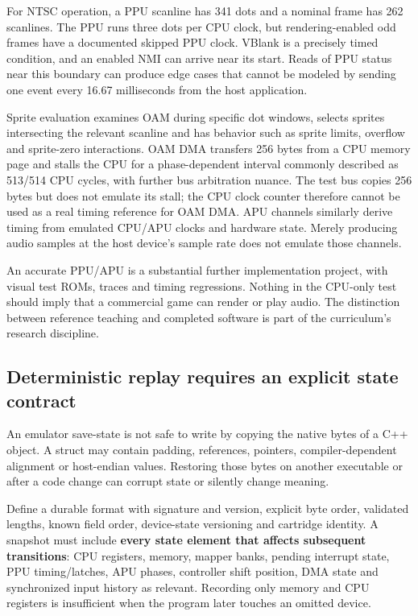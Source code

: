 For NTSC operation, a PPU scanline has 341 dots and a nominal frame has 262 scanlines. The PPU runs three dots per CPU clock, but rendering-enabled odd frames have a documented skipped PPU clock. VBlank is a precisely timed condition, and an enabled NMI can arrive near its start. Reads of PPU status near this boundary can produce edge cases that cannot be modeled by sending one event every 16.67 milliseconds from the host application.

Sprite evaluation examines OAM during specific dot windows, selects sprites intersecting the relevant scanline and has behavior such as sprite limits, overflow and sprite-zero interactions. OAM DMA transfers 256 bytes from a CPU memory page and stalls the CPU for a phase-dependent interval commonly described as 513/514 CPU cycles, with further bus arbitration nuance. The test bus copies 256 bytes but does not emulate its stall; the CPU clock counter therefore cannot be used as a real timing reference for OAM DMA. APU channels similarly derive timing from emulated CPU/APU clocks and hardware state. Merely producing audio samples at the host device's sample rate does not emulate those channels.

An accurate PPU/APU is a substantial further implementation project, with visual test ROMs, traces and timing regressions. Nothing in the CPU-only test should imply that a commercial game can render or play audio. The distinction between reference teaching and completed software is part of the curriculum's research discipline.

\subsection{Deterministic replay requires an explicit state contract}\label{deterministic-replay-requires-an-explicit-state-contract}

An emulator save-state is not safe to write by copying the native bytes of a C++ object. A struct may contain padding, references, pointers, compiler-dependent alignment or host-endian values. Restoring those bytes on another executable or after a code change can corrupt state or silently change meaning.

Define a durable format with signature and version, explicit byte order, validated lengths, known field order, device-state versioning and cartridge identity. A snapshot must include \textbf{every state element that affects subsequent transitions}: CPU registers, memory, mapper banks, pending interrupt state, PPU timing/latches, APU phases, controller shift position, DMA state and synchronized input history as relevant. Recording only memory and CPU registers is insufficient when the program later touches an omitted device.


